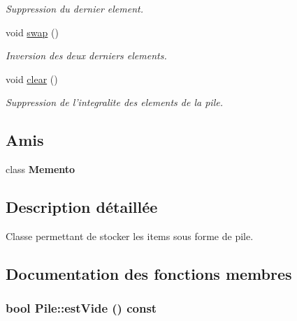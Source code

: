 \begin{CompactItemize}
\begin{CompactList}\small\item\em Suppression du dernier element. \item\end{CompactList}\item 
\hypertarget{class_pile_2c9967dc8f5dcb4372475dee52ed64c6}{
void \hyperlink{class_pile_2c9967dc8f5dcb4372475dee52ed64c6}{swap} ()}
\label{class_pile_2c9967dc8f5dcb4372475dee52ed64c6}

\begin{CompactList}\small\item\em Inversion des deux derniers elements. \item\end{CompactList}\item 
\hypertarget{class_pile_a3991438f190580607d7bbbd50ecc0c3}{
void \hyperlink{class_pile_a3991438f190580607d7bbbd50ecc0c3}{clear} ()}
\label{class_pile_a3991438f190580607d7bbbd50ecc0c3}

\begin{CompactList}\small\item\em Suppression de l'integralite des elements de la pile. \item\end{CompactList}\end{CompactItemize}
\subsection*{Amis}
\begin{CompactItemize}
\item 
\hypertarget{class_pile_15ea7cda491e1c5873aeba1aad9d457a}{
class \textbf{Memento}}
\label{class_pile_15ea7cda491e1c5873aeba1aad9d457a}

\end{CompactItemize}


\subsection{Description détaillée}
Classe permettant de stocker les items sous forme de pile. 

\subsection{Documentation des fonctions membres}
\hypertarget{class_pile_2ca7edab82a4b7a4305093dd9ab14d71}{
\subsubsection[{estVide}]{\setlength{\rightskip}{0pt plus 5cm}bool Pile::estVide () const}}
\label{class_pile_2ca7edab82a4b7a4305093dd9ab14d71}


